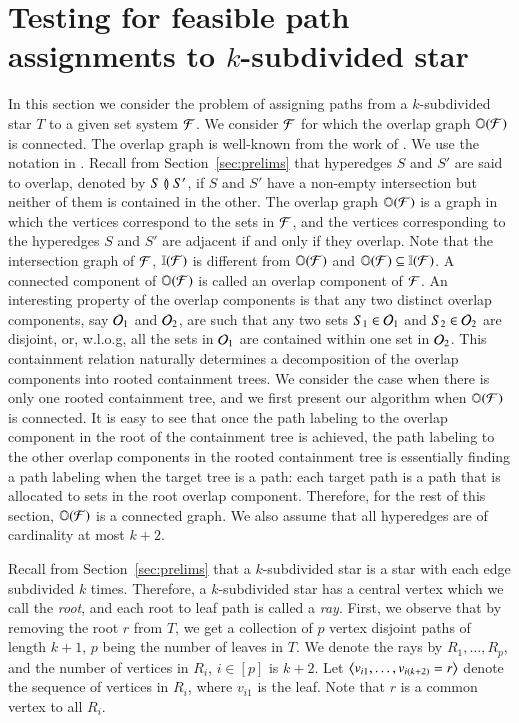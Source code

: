 \documentclass[MS]             %
              {iitmdiss}
\begin{document}
\section{Testing for feasible path assignments to $k$-subdivided star}
\label{sec:ksubdivstar}
In this section we consider the problem of assigning paths from a
$k$-subdivided star $T$ to a given set system ${\cal F}$.  We consider
${\cal F}$ for which the overlap graph $\mathbb O({\cal F})$ is connected.  The
overlap graph is well-known from the work of
\cite{kklv10,nsnrs09,wlh02}.  We use the notation in
\cite{kklv10}. Recall from Section~\ref{sec:prelims} that hyperedges
$S$ and $S'$ are said to overlap, denoted by $S \between S'$, if $S$ and $S'$
have a non-empty intersection but neither of them is contained in the
other. The overlap graph $\mathbb O({\cal F})$ is a graph in which the vertices
correspond to the sets in ${\cal F}$, and the vertices corresponding to the
hyperedges $S$ and $S'$ are adjacent if and only if they overlap.  Note
that the intersection graph of ${\cal F}$, $\mathbb I({\cal F})$ is different from
$\mathbb O({\cal F})$ and $\mathbb O({\cal F}) \subseteq \mathbb I({\cal F})$.  A connected component
of $\mathbb O({\cal F})$ is called an overlap component of ${\cal F}$.  An interesting
property of the overlap components is that any two distinct overlap
components, say ${\cal O}_1$ and ${\cal O}_2$, are such that any two sets $S_1
\in {\cal O}_1$ and $S_2 \in {\cal O}_2$ are disjoint, or, w.l.o.g, all the sets
in ${\cal O}_1$ are contained within one set in ${\cal O}_2$.  This containment
relation naturally determines a decomposition of the overlap
components into rooted containment trees.  We consider the case when
there is only one rooted containment tree, and we first present our
algorithm when $\mathbb O({\cal F})$ is connected.  It is easy to see that once
the path labeling to the overlap component in the root of the
containment tree is achieved, the path labeling to the other overlap
components in the rooted containment tree is essentially finding a
path labeling when the target tree is a path: each target path is a
path that is allocated to sets in the root overlap component.
Therefore, for the rest of this section, $\mathbb O({\cal F})$ is a connected
graph. We also assume that all hyperedges are of cardinality at most
$k+2$.


\xnoindent
Recall from Section~\ref{sec:prelims} that a $k$-subdivided star is a
star with each edge subdivided $k$ times.  Therefore, a $k$-subdivided
star has a central vertex which we call the {\em root}, and each root
to leaf path is called a {\em ray}.  First, we observe that by
removing the root $r$ from $T$, we get a collection of $p$ vertex
disjoint paths of length $k+1$, $p$ being the number of leaves in $T$.
We denote the rays by $R_1, \ldots, R_p$, and the number of vertices in
$R_i$, $i \in [p]$ is $k+2$.  Let
$\left\langle v_{i1},\ldots,v_{i(k+2)}=r \right\rangle$ denote the sequence of vertices in
$R_i$, where $v_{i1}$ is the leaf. Note that $r$ is a common vertex to all $R_i$.
  
\end{document}
